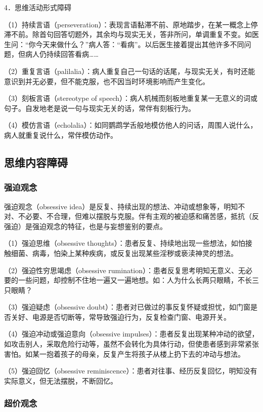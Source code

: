 4．思维活动形式障碍

（1）持续言语（perseveration）：表现言语黏滞不前、原地踏步，在某一概念上停滞不前。除首句回答切题外，其余均与现实无关，答非所问，单调重复不变。如医生问：“你今天来做什么？”病人答：“看病”。以后医生接着提出其他许多不同问题，但病人仍持续回答看病\ldots{}\ldots{}

（2）重复言语（palilalia）：病人重复自己一句话的话尾，与现实无关，有时还能意识到并无必要，但不能克服，也不因当时环境影响而产生变化。

（3）刻板言语（stereotype of
speech）：病人机械而刻板地重复某一无意义的词或句子。自发地老是说一句与现实无关的话，常伴有刻板行为。

（4）模仿言语（echolalia）：如同鹦鹉学舌般地模仿他人的问话，周围人说什么，病人就重复说什么，常伴模仿动作。

\subsection{思维内容障碍}

\subsubsection{强迫观念}

强迫观念（obsessive
idea）是反复、持续出现的想法、冲动或想象等，明知不对、不必要、不合理，但难以摆脱与克服。伴有主观的被迫感和痛苦感，抵抗（反强迫）是强迫观念的特征，也是与妄想鉴别的要点。

（1）强迫思维（obsessive
thoughts）：患者反复、持续地出现一些想法，如怕接触细菌、病毒，怕染上某种疾病，或反复出现某些淫秽或亵渎神灵的想法。

（2）强迫性穷思竭虑（obsessive
rumination）：患者反复思考明知无意义、无必要的一些问题，却控制不住地一遍又一遍地想。如：人为什么长两只眼睛，不长三只眼睛？

（3）强迫疑虑（obsessive
doubt）：患者对已做过的事反复怀疑或担忧，如门窗是否关好、电源是否切断等，常导致强迫行为，反复检查门窗、电源开关。

（4）强迫冲动或强迫意向（obsessive
impulses）：患者反复出现某种冲动的欲望，如攻击别人，采取危险行动等，虽然不会转化为具体行动，但使患者感到非常紧张害怕。如某一抱着孩子的母亲，反复产生将孩子从楼上扔下去的冲动与想法。

（5）强迫回忆（obsessive
reminiscence）：患者对往事、经历反复回忆，明知没有实际意义，但无法摆脱，不断回忆。

\subsubsection{超价观念}

